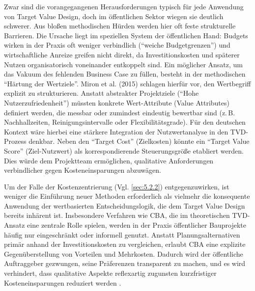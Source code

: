 Zwar sind die vorangegangenen Herausforderungen typisch für jede Anwendung von Target Value Design, doch im öffentlichen Sektor wiegen sie deutlich schwerer. Aus bloßen methodischen Hürden werden hier oft feste strukturelle Barrieren. 
Die Ursache liegt im speziellen System der öffentlichen Hand: Budgets wirken in der Praxis oft weniger verbindlich (\enquote{weiche Budgetgrenzen}) und wirtschaftliche Anreize greifen nicht direkt, da Investitionskosten und späterer Nutzen organisatorisch voneinander entkoppelt sind. \autocite[Vgl.][S.~26]{kozuch_nachhaltigkeit_2024}
Ein möglicher Ansatz, um das Vakuum des fehlenden Business Case zu füllen, besteht in der methodischen \enquote{Härtung der Wertziele}. Miron et al. (2015) schlagen hierfür vor, den Wertbegriff explizit zu strukturieren. Anstatt abstrakter Projektziele (\enquote{Hohe Nutzerzufriedenheit}) müssten konkrete Wert-Attribute (Value Attributes) definiert werden, die messbar oder zumindest eindeutig bewertbar sind (z.\,B. Nachhallzeiten, Reinigungsintervalle oder Flexibilitätsgrade).
Für den deutschen Kontext wäre hierbei eine stärkere Integration der Nutzwertanalyse in den \acs{TVD}-Prozess denkbar. Neben den \enquote{Target Cost} (Zielkosten) könnte ein \enquote{Target Value Score} (Ziel-Nutzwert) als korrespondierende Steuerungsgröße etabliert werden. Dies würde dem Projektteam ermöglichen, qualitative Anforderungen verbindlicher gegen Kosteneinsparungen abzuwägen. \autocite[Vgl.][S.~821]{miron_target_2015}

Um der Falle der Kostenzentrierung (Vgl. \cref{sec:5.2.2}) entgegenzuwirken, ist weniger die Einführung neuer Methoden erforderlich als vielmehr die konsequente Anwendung der wertbasierten Entscheidungslogik, die dem Target Value Design bereits inhärent ist.
Insbesondere Verfahren wie \acf{CBA}, die im theoretischen \acs{TVD}-Ansatz eine zentrale Rolle spielen, werden in der Praxis öffentlicher Bauprojekte häufig nur eingeschränkt oder informell genutzt.
Anstatt Planungsalternativen primär anhand der Investitionskosten zu vergleichen, erlaubt \acs{CBA} eine explizite Gegenüberstellung von Vorteilen und Mehrkosten. Dadurch wird der öffentliche Auftraggeber gezwungen, seine Präferenzen transparent zu machen, und es wird verhindert, dass qualitative Aspekte reflexartig zugunsten kurzfristiger Kosteneinsparungen reduziert werden \autocite[Vgl.][S.~821]{miron_target_2015}.

